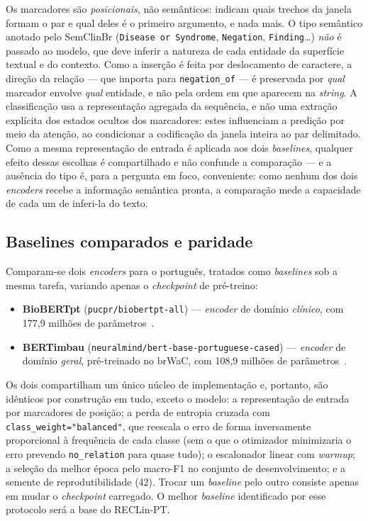 \documentclass[12pt]{article}
\begin{document}
Os marcadores são \emph{posicionais}, não semânticos: indicam quais trechos da
janela formam o par e qual deles é o primeiro argumento, e nada mais. O tipo
semântico anotado pelo SemClinBr (\texttt{Disease or Syndrome},
\texttt{Negation}, \texttt{Finding}\ldots) \emph{não} é passado ao modelo, que
deve inferir a natureza de cada entidade da superfície textual e do contexto.
Como a inserção é feita por deslocamento de caractere, a direção da relação ---
que importa para \texttt{negation\_of} --- é preservada por \emph{qual} marcador
envolve \emph{qual} entidade, e não pela ordem em que aparecem na \emph{string}.
A classificação usa a representação agregada da sequência, e não uma extração
explícita dos estados ocultos dos marcadores: estes influenciam a predição por
meio da atenção, ao condicionar a codificação da janela inteira ao par
delimitado. Como a mesma representação de entrada é aplicada aos dois
\emph{baselines}, qualquer efeito dessas escolhas é compartilhado e não confunde
a comparação --- e a ausência do tipo é, para a pergunta em foco, conveniente:
como nenhum dos dois \emph{encoders} recebe a informação semântica pronta, a
comparação mede a capacidade de cada um de inferi-la do texto.

\subsection{Baselines comparados e paridade}
Comparam-se dois \emph{encoders} para o português, tratados como \emph{baselines}
sob a mesma tarefa, variando apenas o \emph{checkpoint} de pré-treino:
\begin{itemize}
  \item \textbf{BioBERTpt} (\texttt{pucpr/biobertpt-all}) --- \emph{encoder} de
  domínio \emph{clínico}, com 177,9 milhões de parâmetros~\cite{schneider:20}.
  \item \textbf{BERTimbau} (\texttt{neuralmind/bert-base-portuguese-cased}) ---
  \emph{encoder} de domínio \emph{geral}, pré-treinado no brWaC, com 108,9
  milhões de parâmetros~\cite{souza:20}.
\end{itemize}
Os dois compartilham um único núcleo de implementação e, portanto, são idênticos
por construção em tudo, exceto o modelo: a representação de entrada por
marcadores de posição; a perda de entropia cruzada com
\texttt{class\_weight="balanced"}, que reescala o erro de forma inversamente
proporcional à frequência de cada classe (sem o que o otimizador minimizaria o
erro prevendo \texttt{no\_relation} para quase tudo); o escalonador linear com
\emph{warmup}; a seleção da melhor época pelo macro-F1 no conjunto de
desenvolvimento; e a semente de reprodutibilidade (42). Trocar um \emph{baseline}
pelo outro consiste apenas em mudar o \emph{checkpoint} carregado. O melhor
\emph{baseline} identificado por esse protocolo será a base do RECLin-PT.
\end{document}
